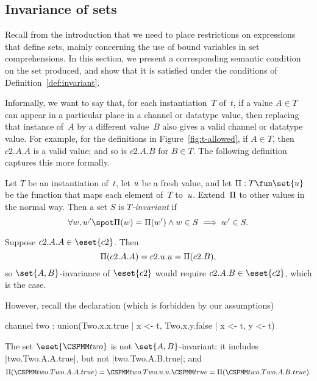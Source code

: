 
\subsection{Invariance of sets}

Recall from the introduction that we need to place restrictions on expressions
that define sets, mainly concerning the use of bound variables in set
comprehensions.  In this section, we present a corresponding semantic
condition on the set produced, and show that it is satisfied under the
conditions of Definition~\ref{def:invariant}.

Informally, we want to say that, for each instantiation~$T$ of~$t$, if a value
$A \in T$ can appear in a particular place in a channel or datatype value,
then replacing that instance of~$A$ by a different value~$B$ also gives a
valid channel or datatype value.  For example, for the definitions in
Figure~\ref{fig:t-allowed}, if $A \in T$, then $c2.A.A$ is a valid
value; and so is $c2.A.B$ for  $B \in T$.  The following
definition captures this more formally.
%
\begin{definition}
Let $T$ be an instantiation of~$t$, let $u$ be a fresh value, and let
$\unitf : T \fun \set{\unit}$ be the function that maps each element of~$T$
to~$u$. Extend~$\Pi$ to other values in the normal way.  Then a set $S$
is \emph{$T$-invariant} if
\[
\forall w, w' \spot
  \unitf(w) = \unitf(w') \land w \in S  \implies w' \in S.
\]
\end{definition}


\begin{example}
Suppose $c2.A.A \in \eset{c2}$.  Then 
\[
\Pi(c2.A.A) = c2.u.u = \Pi(c2.B),
\]
so $\set{A,B}$-invariance of $\eset{c2}$ would require $c2.A.B \in
\eset{c2}$, which is the case.

However, recall the declaration (which is forbidden by our assumptions)
%
\begin{cspm}
channel two : union({Two.x.x.true | x <- t}, {Two.x.y.false | x <- t, y <- t})
\end{cspm}
%
The set $\eset{\M{two}}$ is not $\set{A,B}$-invariant: it includes
|two.Two.A.A.true|, but not |two.Two.A.B.true|; and
\[
\unitf(\M{two.Two.A.A.true}) = \M{two.Two}.u.u.\M{true} =
   \unitf(\M{two.Two.A.B.true}).
\]
\end{example}


